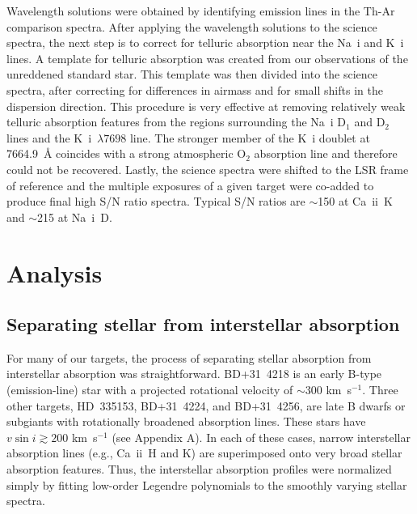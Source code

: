 \documentclass[fleqn,usenatbib]{mnras}
\begin{document}
Wavelength solutions were obtained by identifying emission lines in the Th-Ar comparison spectra. After applying the wavelength solutions to the science spectra, the next step is to correct for telluric absorption near the Na~{\sc i} and K~{\sc i} lines. A template for telluric absorption was created from our observations of the unreddened standard star. This template was then divided into the science spectra, after correcting for differences in airmass and for small shifts in the dispersion direction. This procedure is very effective at removing relatively weak telluric absorption features from the regions surrounding the Na~{\sc i} D$_1$ and D$_2$ lines and the K~{\sc i}~$\lambda7698$ line. The stronger member of the K~{\sc i} doublet at 7664.9~\AA{} coincides with a strong atmospheric O$_2$ absorption line and therefore could not be recovered. Lastly, the science spectra were shifted to the LSR frame of reference and the multiple exposures of a given target were co-added to produce final high S/N ratio spectra. Typical S/N ratios are $\sim$150 at Ca~{\sc ii}~K and $\sim$215 at Na~{\sc i}~D.

\section{Analysis}
\subsection{Separating stellar from interstellar absorption}
For many of our targets, the process of separating stellar absorption from interstellar absorption was straightforward. BD+31~4218 is an early B-type (emission-line) star with a projected rotational velocity of $\sim$300 km~s$^{-1}$. Three other targets, HD~335153, BD+31~4224, and BD+31~4256, are late B dwarfs or subgiants with rotationally broadened absorption lines. These stars have $v \sin i\gtrsim200$ km~s$^{-1}$ (see Appendix A). In each of these cases, narrow interstellar absorption lines (e.g., Ca~{\sc ii}~H and K) are superimposed onto very broad stellar absorption features. Thus, the interstellar absorption profiles were normalized simply by fitting low-order Legendre polynomials to the smoothly varying stellar spectra.
\end{document}
